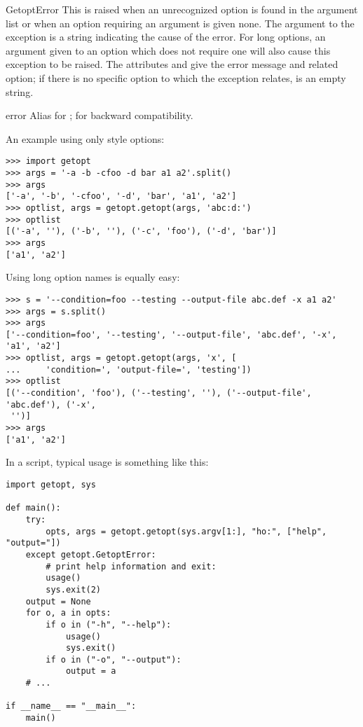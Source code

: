 \begin{excdesc}{GetoptError}
This is raised when an unrecognized option is found in the argument
list or when an option requiring an argument is given none.
The argument to the exception is a string indicating the cause of the
error.  For long options, an argument given to an option which does
not require one will also cause this exception to be raised.  The
attributes  and  give the error message and
related option; if there is no specific option to which the exception
relates,  is an empty string.

\end{excdesc}

\begin{excdesc}{error}
Alias for ; for backward compatibility.
\end{excdesc}


An example using only \UNIX{} style options:

\begin{verbatim}
>>> import getopt
>>> args = '-a -b -cfoo -d bar a1 a2'.split()
>>> args
['-a', '-b', '-cfoo', '-d', 'bar', 'a1', 'a2']
>>> optlist, args = getopt.getopt(args, 'abc:d:')
>>> optlist
[('-a', ''), ('-b', ''), ('-c', 'foo'), ('-d', 'bar')]
>>> args
['a1', 'a2']
\end{verbatim}

Using long option names is equally easy:

\begin{verbatim}
>>> s = '--condition=foo --testing --output-file abc.def -x a1 a2'
>>> args = s.split()
>>> args
['--condition=foo', '--testing', '--output-file', 'abc.def', '-x', 'a1', 'a2']
>>> optlist, args = getopt.getopt(args, 'x', [
...     'condition=', 'output-file=', 'testing'])
>>> optlist
[('--condition', 'foo'), ('--testing', ''), ('--output-file', 'abc.def'), ('-x',
 '')]
>>> args
['a1', 'a2']
\end{verbatim}

In a script, typical usage is something like this:

\begin{verbatim}
import getopt, sys

def main():
    try:
        opts, args = getopt.getopt(sys.argv[1:], "ho:", ["help", "output="])
    except getopt.GetoptError:
        # print help information and exit:
        usage()
        sys.exit(2)
    output = None
    for o, a in opts:
        if o in ("-h", "--help"):
            usage()
            sys.exit()
        if o in ("-o", "--output"):
            output = a
    # ...

if __name__ == "__main__":
    main()
\end{verbatim}
